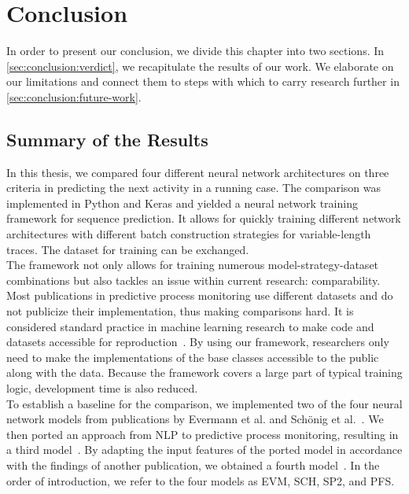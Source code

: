 \chapter{Conclusion} \label{chap:conclusion}
In order to present our conclusion, we divide this chapter into two sections.
In \autoref{sec:conclusion:verdict}, we recapitulate the results of our work.
We elaborate on our limitations and connect them to steps with which to carry research further in \autoref{sec:conclusion:future-work}.

\section{Summary of the Results} \label{sec:conclusion:verdict}
In this thesis, we compared four different neural network architectures on three criteria in predicting the next activity in a running case.
The comparison was implemented in Python and Keras and yielded a neural network training framework for sequence prediction.
It allows for quickly training different network architectures with different batch construction strategies for variable-length traces.
The dataset for training can be exchanged.\\

\noindent The framework not only allows for training numerous model-strategy-dataset combinations but also tackles an issue within current research: comparability.
Most publications in predictive process monitoring use different datasets and do not publicize their implementation, thus making comparisons hard.
It is considered standard practice in machine learning research to make code and datasets accessible for reproduction~\cite{russell1995modern}.
By using our framework, researchers only need to make the implementations of the base classes accessible to the public along with the data.
Because the framework covers a large part of typical training logic, development time is also reduced.\\

To establish a baseline for the comparison, we implemented two of the four neural network models from publications by Evermann et al. and Schönig et al.~\cite{evermann2016, schoenig2018}.
We then ported an approach from NLP to predictive process monitoring, resulting in a third model~\cite{shibata2016bipartite}.
By adapting the input features of the ported model in accordance with the findings of another publication, we obtained a fourth model~\cite{klinkmuller2018reliablemonitoring}.
In the order of introduction, we refer to the four models as EVM, SCH, SP2, and PFS.\\


